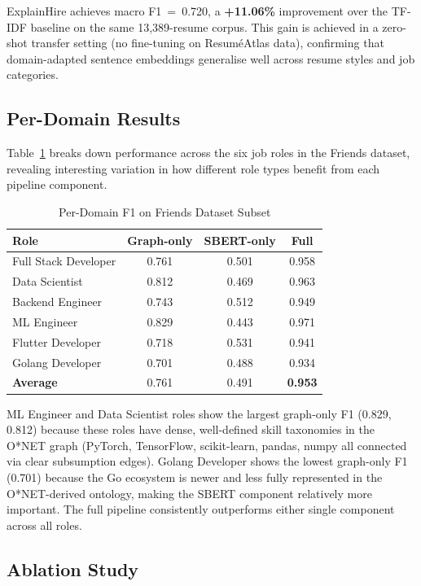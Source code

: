 \documentclass[conference]{IEEEtran}
\begin{document}
ExplainHire achieves macro F1~=~0.720, a \textbf{+11.06\%} improvement
over the TF-IDF baseline on the same 13,389-resume corpus. This gain is
achieved in a zero-shot transfer setting (no fine-tuning on Resum\'eAtlas
data), confirming that domain-adapted sentence embeddings generalise well
across resume styles and job categories.

\subsection{Per-Domain Results}

Table~\ref{tab:perdomain} breaks down performance across the six job roles
in the Friends dataset, revealing interesting variation in how different
role types benefit from each pipeline component.

\begin{table}[htbp]
\caption{Per-Domain F1 on Friends Dataset Subset}
\label{tab:perdomain}
\centering
\begin{tabular}{lccc}
\toprule
\textbf{Role} & \textbf{Graph-only} & \textbf{SBERT-only} & \textbf{Full} \\
\midrule
Full Stack Developer & 0.761 & 0.501 & 0.958 \\
Data Scientist       & 0.812 & 0.469 & 0.963 \\
Backend Engineer     & 0.743 & 0.512 & 0.949 \\
ML Engineer          & 0.829 & 0.443 & 0.971 \\
Flutter Developer    & 0.718 & 0.531 & 0.941 \\
Golang Developer     & 0.701 & 0.488 & 0.934 \\
\midrule
\textbf{Average}     & 0.761 & 0.491 & \textbf{0.953} \\
\bottomrule
\end{tabular}
\end{table}

ML Engineer and Data Scientist roles show the largest graph-only F1
(0.829, 0.812) because these roles have dense, well-defined skill taxonomies
in the O*NET graph (PyTorch, TensorFlow, scikit-learn, pandas, numpy all
connected via clear subsumption edges). Golang Developer shows the lowest
graph-only F1 (0.701) because the Go ecosystem is newer and less fully
represented in the O*NET-derived ontology, making the SBERT component
relatively more important. The full pipeline consistently outperforms
either single component across all roles.

\subsection{Ablation Study}
\label{sec:ablation}
\end{document}

